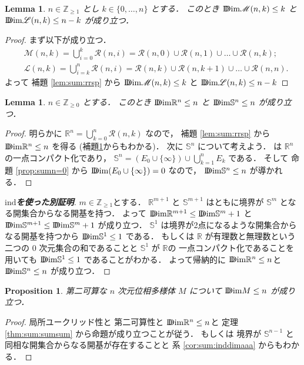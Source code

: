 \documentclass[leqno, a4paper, 12pt]{jsarticle}
\theoremstyle{plain}
\newtheorem{prop}[thm]{Proposition}
\newtheorem{lem}[thm]{Lemma}
\theoremstyle{definition}
\theoremstyle{remark}
\newcommand{\zz}{\mathbb{Z}}
\newcommand{\rr}{\mathbb{R}}
\newcommand{\yoind}{\mathrm{ind}}
\newcommand{\yoddim}{\mathrm{D\hspace{-5.5pt}Dim}}
\newcommand{\yospfont}[1]{\mathbb{#1}}
\newcommand{\yosphere}[1]{\yospfont{S}^{#1}}
\newcommand{\yospspfont}{\mathscr}
\newcommand{\yorrsp}[2]{\yospspfont{R}({#1}, {#2})}
\newcommand{\yommsp}[2]{\yospspfont{M}({#1}, {#2})}
\newcommand{\yollsp}[2]{\yospspfont{L}({#1}, {#2})}
\numberwithin{equation}{section}
\begin{document}
\begin{lem}\label{lem:sum:mmspllsp}
$n\in \zz_{\ge 1}$
とし
$k\in \{0, \dots, n\}$
とする．
このとき
$\yoddim \yommsp{n}{k}\le k$
と
$\yoddim \yollsp{n}{k} \le n- k$
が成り立つ．
\end{lem}
\begin{proof}
まず以下が成り立つ．
\begin{align}
&\yommsp{n}{k}=\bigcup_{i=0}^{k}\yorrsp{n}{i}=\yorrsp{n}{0}\cup \yorrsp{n}{1} \cup \dots \cup \yorrsp{n}{k};\\
&\yollsp{n}{k}=\bigcup_{i=k}^{n}\yorrsp{n}{i}
=\yorrsp{n}{k}\cup \yorrsp{n}{k+1}\cup \dots \cup \yorrsp{n}{n}. 
\end{align}
よって
補題
\ref{lem:sum:rrsp}
から
$\yoddim \yommsp{n}{k}\le k$
と
$\yoddim \yollsp{n}{k}\le n- k$
\end{proof}

\begin{lem}\label{lem:sum:nnn}
$n\in \zz_{\ge 0}$
とする．
このとき
$\yoddim\rr^{n}\le n$
と
$\yoddim\mathbb{S}^{n}\le n$
が成り立つ．
\end{lem}
\begin{proof}
明らかに
$\rr^{n}=\bigcup_{k=0}^{n}\yorrsp{n}{k}$
なので，
補題
\ref{lem:sum:rrsp}
から
$\yoddim\rr^{n}\le n$
を得る
(補題\ref{lem:sum:mmspllsp}からもわかる)．
次に
$\mathbb{S}^{n}$
について考えよう．
は
$\rr^{n}$
の一点コンパクト化であり，
$\mathbb{S}^{n}=(E_{0}\cup\{\infty\})\cup \bigcup_{k=1}^{n}E_{k}$
である．
そして
命題 
\ref{prop:sumn=0}
から
$\yoddim(E_{0}\cup\{\infty\})= 0$
なので，
$\yoddim\mathbb{S}^{n}\le n$
が導かれる．
\end{proof}

\begin{proof}[\textbf{$\yoind$を使った別証明}]
$m\in \zz_{\ge 1}$とする．
$\rr^{m+1}$
と
$\yosphere{m+1}$
はともに境界が
$\yosphere{m}$
となる開集合からなる開基を持つ．
よって
$\yoddim\rr^{m+1}\le \yoddim\yosphere{m}+1$
と
$\yoddim\yosphere{m+1}\le \yoddim\yosphere{m}+1$
が成り立つ．
$\mathbb{S}^{1}$
は境界が2点になるような開集合からなる開基を持つから
$\yoddim\mathbb{S}^{1}\le 1$
である．
もしくは
$\rr$
が有理数と無理数という二つの
$0$
次元集合の和であることと
$\mathbb{S}^{1}$
が
$\rr$の
一点コンパクト化であることを用いても
$\yoddim\yosphere{1}\le 1$
であることがわかる．
よって帰納的に
$\yoddim\rr^{n}\le n$と
$\yoddim\yosphere{n}\le n$
が成り立つ．
\end{proof}




\begin{prop}\label{prop:sum:mfddimcoince}
第二可算な
$n$
次元位相多様体
$M$
について
$\yoddim M\le n$
が成り立つ．

\end{prop}
\begin{proof}
局所ユークリッド性と
第二可算性と
$\yoddim\rr^{n}\le n$と
定理
 \ref{thm:sum:sumsum}
 から命題が成り立つことが従う．
もしくは
境界が
$\yosphere{n-1}$
と同相な開集合からなる開基が存在することと
系
\ref{cor:sum:inddimaaa}
からもわかる．
\end{proof}
\end{document}
